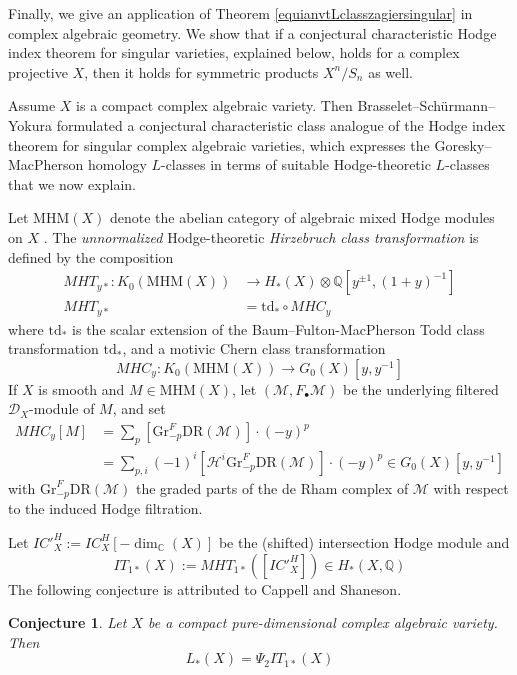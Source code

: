 \documentclass[11pt,leqno,twoside]{amsart}
\theoremstyle{plainsl}
\newtheorem{conjecture}[theorem]{Conjecture}
\theoremstyle{definition}
\newcommand{\Q}{\mathbb{Q}}
\newcommand{\cH}{\mathcal{H}}
\newcommand{\cM}{\mathcal{M}}
\newcommand{\sD}{\mathscr{D}}
\newcommand{\gr}{\mathrm{Gr}}
\newcommand{\DR}{\mathrm{DR}}
\newcommand{\MHM}{\mathrm{MHM}}
\newcommand{\mhm}{\mathrm{MHM}}
\newcommand{\td}{\mathrm{td}}
\begin{document}
Finally, we give an application of Theorem \ref{equianvtLclasszagiersingular} in complex  algebraic geometry. We show that if a conjectural characteristic  Hodge index theorem for singular varieties, explained below, holds for a complex projective $X$, then it holds for symmetric products $X^{n}/S_n$ as well.


Assume $X$ is a compact complex algebraic variety. Then Brasselet–Sch\"urmann–Yokura \cite{BSY} formulated a conjectural characteristic class analogue of the Hodge index theorem for singular complex algebraic varieties, which expresses the Goresky--MacPherson homology $L$-classes in terms of suitable Hodge-theoretic $L$-classes that we now explain.  


Let $\MHM(X)$ denote the abelian category of algebraic mixed Hodge modules on $X$ \cite{Sa}. The \textit{unnormalized} Hodge-theoretic {\it Hirzebruch class transformation} \cite{BSY} is defined by the composition
\begin{align*}
MHT_{y\ast}: K_0(\mhm(X)) &\to H_*(X) \otimes \Q[y^{\pm 1}, (1+y)^{-1}] \\
MHT_{y\ast} &=\td_{\ast}  \circ MHC_y
\end{align*}
where $\td_{\ast}$
is the scalar extension of the
Baum--Fulton-MacPherson Todd class transformation $\td_*$, and a motivic Chern class transformation
\[
 MHC_y: K_0(\MHM(X)) \to  G_0(X)[y,y^{-1}]
\]
If $X$ is smooth and $M\in \MHM(X)$, let $(\cM,F_{\bullet}\cM)$ be the underlying filtered $\sD_X$-module of $M$, and set
\[
\begin{split}
MHC_y[M] &= \sum_{p}  \left[\gr^F_{-p}\DR(\cM)\right] \cdot(-y)^p  \\
&= \sum_{p,i} (-1)^i \left[\cH^i \gr^F_{-p}\DR(\cM)\right] \cdot(-y)^p \in G_0(X)[y,y^{-1}]
\end{split}
\]
with $\gr^F_{-p}\DR(\cM)$ the graded parts of the de Rham complex of $\cM$ with respect to the induced Hodge filtration. 

Let $IC'^H_X:=IC_X^H[-\dim_{\mathbb{C}}(X)]$ be the (shifted) intersection Hodge module and $$IT_{1*}(X):=MHT_{1*}([IC'^H_X]) \in H_*(X,\Q)$$
The following conjecture is attributed to Cappell and Shaneson.



\begin{conjecture} \label{BSYi}\cite{BSY}
Let $X$ be a compact pure-dimensional complex algebraic variety. Then
\begin{equation}\label{conji}
L_*(X)=\Psi_2 IT_{1*}(X)
\end{equation}
\end{conjecture}
\end{document}
